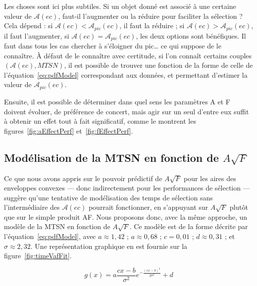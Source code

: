 	Les choses sont ici plus subtiles. Si un objet donné est associé à une certaine valeur de $\mathcal{A}(ec)$, faut-il l'augmenter ou la réduire pour faciliter la sélection ? Cela dépend : si $\mathcal{A}(ec) < \mathcal{A}_{pic}(ec)$, il faut la réduire ; si $\mathcal{A}(ec) > \mathcal{A}_{pic}(ec)$, il faut l'augmenter, si $\mathcal{A}(ec) = \mathcal{A}_{pic}(ec)$, les deux options sont bénéfiques. Il faut dans tous les cas chercher à \og s'éloigner \fg{} du pic\ldots{} ce qui suppose de le connaître. À défaut de le connaître avec certitude, si l'on connaît certains couples $\left( \mathcal{A}(ec), MTSN\right)$, il est possible de trouver une fonction de la forme de celle de l'équation~\ref{eq:pdfModel} correspondant aux données, et permettant d'estimer la valeur de $\mathcal{A}_{pic}(ec)$.
	
	Ensuite, il est possible de déterminer dans quel sens les paramètres A et F doivent évoluer, de préférence de concert, mais agir sur un seul d'entre eux suffit à obtenir un effet tout à fait significatif, comme le montrent les figures~\ref{fig:aEffectPerf} et~\ref{fig:fEffectPerf}.
	
	\subsection{Modélisation de la MTSN en fonction de \texorpdfstring{$A\sqrt{F}$}{A* racine carrée de F}}
	Ce que nous avons appris sur le pouvoir prédictif de $A\sqrt{F}$ pour les aires des enveloppes convexes --- donc indirectement pour les performances de sélection --- suggère qu'une tentative de modélisation des temps de sélection sans l'intermédiaire des $\mathcal{A}(ec)$ pourrait fonctionner, en s'appuyant sur $A\sqrt{F}$ plutôt que sur le simple produit AF. Nous proposons donc, avec la même approche, un modèle de la MTSN en fonction de $A\sqrt{F}$. Ce modèle est de la forme décrite par l'équation~\ref{eq:pdfModel}, avec $a \approx 1,42$ ; $a \approx 0,68$ ; $c = 0,01$ ; $d \approx 0,31$ ; et $\sigma \approx 2,32$. Une représentation graphique en est fournie sur la figure~\ref{fig:timeVafFit}.
	
	\begin{equation}
		g(x) = a\frac{cx-b}{\sigma^{2}}e^{-\frac{(cx-b)^{2}}{2\sigma^{2}} } + d
		\label{eq:pdfModelAf}
	\end{equation}
	
